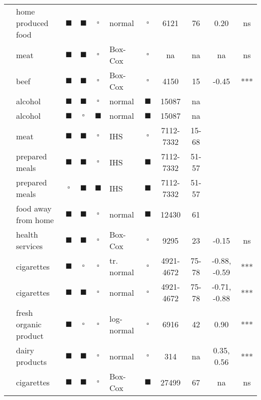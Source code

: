 \begin{landscape}
\begin{center}
\begin{footnotesize}
\begin{longtable}{llccclccccc}
  \cite{BERT:CAIL:NICH:99} & home produced food & $\blacksquare$ & $\blacksquare$ & $\square$ & normal & $\square$ & 6121 & 76 & 0.20 & ns \\ 
  \cite{BURT:YOUN:00} & meat & $\blacksquare$ & $\blacksquare$ & $\square$ & Box-Cox & $\square$ & na & na & na & ns \\ 
  \cite{JONE:YEN:00} & beef & $\blacksquare$ & $\blacksquare$ & $\square$ & Box-Cox & $\square$ & 4150 & 15 & -0.45 & *** \\ 
  \cite{ANGU:GIL:GRAC:01} & alcohol & $\blacksquare$ & $\blacksquare$ & $\square$ & normal & $\blacksquare$ & 15087 & na &  &  \\ 
  \cite{ANGU:GIL:GRAC:01} & alcohol & $\blacksquare$ & $\square$ & $\blacksquare$ & normal & $\blacksquare$ & 15087 & na &  &  \\ 
  \cite{NEWM:HENC:MATT:01} & meat & $\blacksquare$ & $\blacksquare$ & $\square$ & IHS & $\square$ & 7112-7332 & 15-68 &  &  \\ 
  \cite{NEWM:HENC:MATT:03} & prepared meals & $\blacksquare$ & $\blacksquare$ & $\square$ & IHS & $\blacksquare$ & 7112-7332 & 51-57 &  &  \\ 
  \cite{NEWM:HENC:MATT:03} & prepared meals & $\square$ & $\blacksquare$ & $\blacksquare$ & IHS & $\blacksquare$ & 7112-7332 & 51-57 &  &  \\ 
  \cite{MUTL:GRAC:04} & food away from home & $\blacksquare$ & $\blacksquare$ & $\square$ & normal & $\blacksquare$ & 12430 & 61 &  &  \\ 
  \cite{CHAZ:05} & health services & $\blacksquare$ & $\blacksquare$ & $\square$ & Box-Cox & $\square$ & 9295 & 23 & -0.15 & ns \\ 
  \cite{YEN:05} & cigarettes & $\blacksquare$ & $\square$ & $\square$ & tr. normal & $\square$ & 4921-4672 & 75-78 & -0.88, -0.59 & *** \\ 
  \cite{YEN:05} & cigarettes & $\blacksquare$ & $\blacksquare$ & $\square$ & normal & $\square$ & 4921-4672 & 75-78 & -0.71, -0.88 & *** \\ 
  \cite{ZHAN:HUAN:LIN:08} & fresh organic product & $\blacksquare$ & $\square$ & $\square$ & log-normal & $\square$ & 6916 & 42 & 0.90 & *** \\ 
  \cite{FULL:BEGH:ROZE:07} & dairy products & $\blacksquare$ & $\blacksquare$ & $\square$ & normal & $\square$ & 314 & na & 0.35, 0.56 & *** \\ 
  \cite{ARIS:PIER:08} & cigarettes & $\blacksquare$ & $\blacksquare$ & $\square$ & Box-Cox & $\blacksquare$ & 27499 & 67 & na & ns \\ 

\end{longtable}
\end{footnotesize}
\end{center}
\end{landscape}
